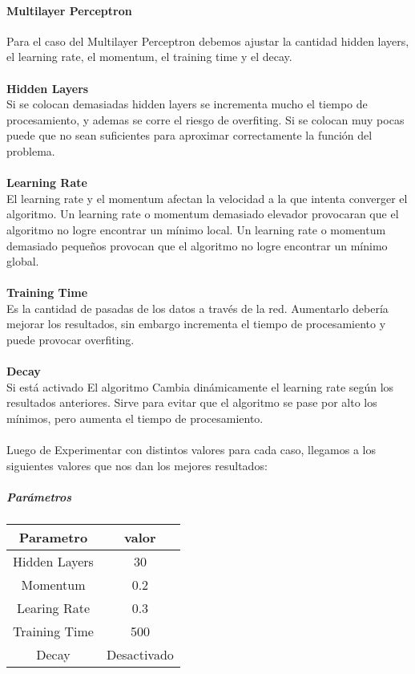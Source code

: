       \paragraph{Multilayer Perceptron}
          Para el caso del Multilayer Perceptron debemos ajustar la cantidad
          hidden layers, el learning rate, el momentum, el training time y el
          decay.\\\\
          \textbf{Hidden Layers\\}
          Si se colocan demasiadas hidden layers se incrementa mucho el tiempo
          de procesamiento, y ademas se corre el riesgo de overfiting. Si se
          colocan muy pocas puede que no sean suficientes para aproximar
          correctamente la función del problema.\\\\
          \textbf{Learning Rate\\}
          El learning rate y el momentum afectan la velocidad a la que intenta
          converger el algoritmo. Un learning rate o momentum demasiado elevador
          provocaran que el algoritmo no logre encontrar un mínimo local. Un
          learning rate o momentum demasiado pequeños provocan que el algoritmo
          no logre encontrar un mínimo global.\\\\
          \textbf{Training Time\\}
          Es la cantidad de pasadas de los datos a través de la red. Aumentarlo
          debería mejorar los resultados, sin embargo incrementa el tiempo de
          procesamiento y puede provocar overfiting.\\\\
          \textbf{Decay\\}
          Si está activado El algoritmo Cambia dinámicamente el learning rate
          según los resultados anteriores. Sirve para evitar que el algoritmo
          se pase por alto los mínimos, pero aumenta el tiempo de
          procesamiento.\\\\
          Luego de Experimentar con distintos valores para cada caso, llegamos a
          los siguientes valores que nos dan los mejores resultados:
          \subparagraph{Parámetros}
                \begin{tabular}{||c | c||}
                    \hline
                    \textbf{Parametro} & \textbf{valor} \\ [0.5ex]
                    \hline\hline
                    Hidden Layers & 30 \\
                    \hline
                    Momentum & 0.2 \\
                    \hline
                    Learing Rate & 0.3 \\
                    \hline
                    Training Time & 500 \\
                    \hline
                    Decay & Desactivado \\
                    \hline
                \end{tabular}
    \newpage

